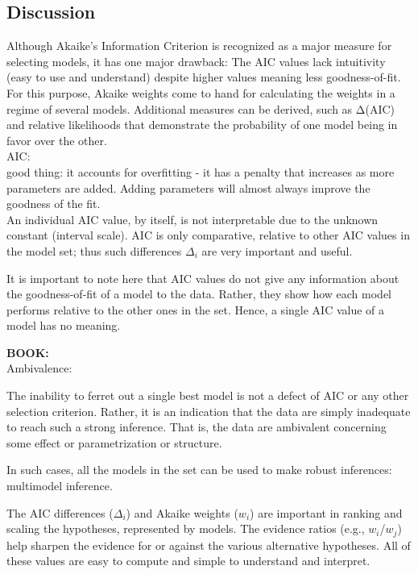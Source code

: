 \documentclass[11pt]{article}
\begin{document}
\begin{linenumbers}
	
	\section{Discussion}

	Although Akaike's Information Criterion is recognized as a major measure for selecting models, it has one major drawback: The AIC values lack intuitivity (easy to use and understand) despite higher values meaning less goodness-of-fit. For this purpose, Akaike weights come to hand for calculating the weights in a regime of several models. Additional measures can be derived, such as Δ(AIC) and relative likelihoods that demonstrate the probability of one model being in favor over the other.\\
	
	AIC:\\
	good thing: it accounts for overfitting - it has a penalty that increases as more parameters are added. Adding parameters will almost always improve the goodness of the fit.\\
	An individual AIC value, by itself, is not interpretable due to the unknown constant (interval scale). AIC is only comparative, relative to other AIC values in the model set; thus such differences $\Delta_i$ are very important and useful.
	
	It is important to note here that AIC values do not give any information about the goodness-of-fit of a model to the data. Rather, they show how each model performs relative to the other ones in the set. Hence, a single AIC value of a model has no meaning.
	
	\textbf{BOOK:}\\
	Ambivalence:
	\par The inability to ferret out a single best model is not a defect of AIC or any other selection criterion. Rather, it is an indication that the data are simply inadequate to reach such a strong inference. That is, the data are ambivalent concerning some effect or parametrization or structure.
	\par In such cases, all the models in the set can be used to make robust inferences: multimodel inference.\\

	\par The AIC differences ($\Delta_i$) and Akaike weights ($w_i$) are important in ranking and scaling the hypotheses, represented by models. The evidence ratios (e.g., $w_i$/$w_j$) help sharpen the evidence for or against the various alternative hypotheses. All of these values are easy to compute and simple to understand and interpret.\\


\end{linenumbers}
\end{document}
